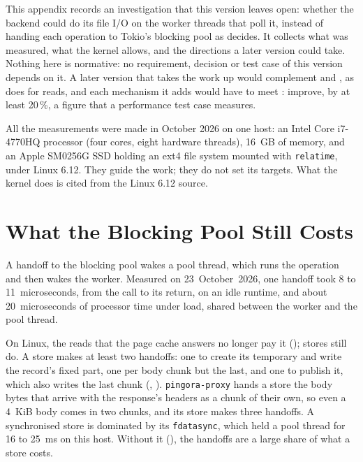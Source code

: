%

This appendix records an investigation that this version leaves open:
whether the backend could do its file I/O on the worker threads that poll
it, instead of handing each operation to Tokio's blocking pool as
 decides. It collects what was measured,
what the kernel allows, and the directions a later version could take.
Nothing here is normative: no requirement, decision or test case of this
version depends on it. A later version that takes the work up would
complement  and
, as  does
for reads, and each mechanism it adds would have to meet
: improve, by at least 20\,\%, a figure that a
performance test case measures.

All the measurements were made in October 2026 on one host: an Intel Core
i7-4770HQ processor (four cores, eight hardware threads), 16~GB of memory,
and an Apple SM0256G SSD holding an ext4 file system mounted with
\texttt{relatime}, under Linux 6.12. They guide the work; they do not set
its targets. What the kernel does is cited from the Linux 6.12 source.

\section{What the Blocking Pool Still Costs}
\label{app:executor-cost}

A handoff to the blocking pool wakes a pool thread, which runs the
operation and then wakes the worker. Measured on 23~October~2026, one
handoff took 8 to 11~microseconds, from the call to its return, on an idle
runtime, and about 20~microseconds of processor time under load, shared
between the worker and the pool thread.

On Linux, the reads that the page cache answers no longer pay it
(); stores still do. A store makes at
least two handoffs: one to create its temporary and write the record's
fixed part, one per body chunk but the last, and one to publish it, which
also writes the last chunk (,
).
\texttt{pingora-proxy} hands a store the body bytes that arrive with the
response's headers as a chunk of their own, so even a 4~KiB body comes in
two chunks, and its store makes three handoffs. A synchronised store is dominated by its
\texttt{fdatasync}, which held a pool thread for 16 to 25~ms on this host.
Without it (), the handoffs are a large
share of what a store costs.

